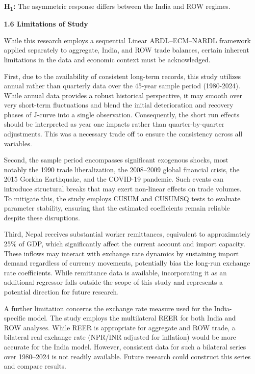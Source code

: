 \documentclass[12pt]{article}
\begin{document}
\textbf{H\textsubscript{1}:} The asymmetric response differs between the India and ROW regimes.

\vspace{0.5cm}
\noindent\textbf{1.6 Limitations of Study}

While this research employs a sequential Linear ARDL–ECM–NARDL framework applied separately to aggregate, India, and ROW trade balances, certain inherent limitations in the data and economic context must be acknowledged.

First, due to the availability of consistent long-term records, this study utilizes annual rather than quarterly data over the 45-year sample period (1980-2024). While annual data provides a robust historical perspective, it may smooth over very short-term fluctuations and blend the initial deterioration and recovery phases of J-curve into a single observation. Consequently, the short run effects should be interpreted as year one impacts rather than quarter-by-quarter adjustments. This was a necessary trade off to ensure the consistency across all variables. 

Second, the sample period encompasses significant exogenous shocks, most notably the 1990 trade liberalization, the 2008–2009 global financial crisis, the 2015 Gorkha Earthquake, and the COVID-19 pandemic. Such events can introduce structural breaks that may exert non-linear effects on trade volumes. To mitigate this, the study employs CUSUM and CUSUMSQ tests to evaluate parameter stability, ensuring that the estimated coefficients remain reliable despite these disruptions.

Third, Nepal receives substantial worker remittances, equivalent to approximately 25\% of GDP, which significantly affect the current account and import capacity. These inflows may interact with exchange rate dynamics by sustaining import demand regardless of currency movements, potentially bias the long-run exchange rate coefficients. While remittance data is available, incorporating it as an additional regressor falls outside the scope of this study and represents a potential direction for future research.

A further limitation concerns the exchange rate measure used for the India-specific model. The study employs the multilateral REER for both India and ROW analyses. While REER is appropriate for aggregate and ROW trade, a bilateral real exchange rate (NPR/INR adjusted for inflation) would be more accurate for the India model. However, consistent data for such a bilateral series over 1980–2024 is not readily available. Future research could construct this series and compare results.
\end{document}
